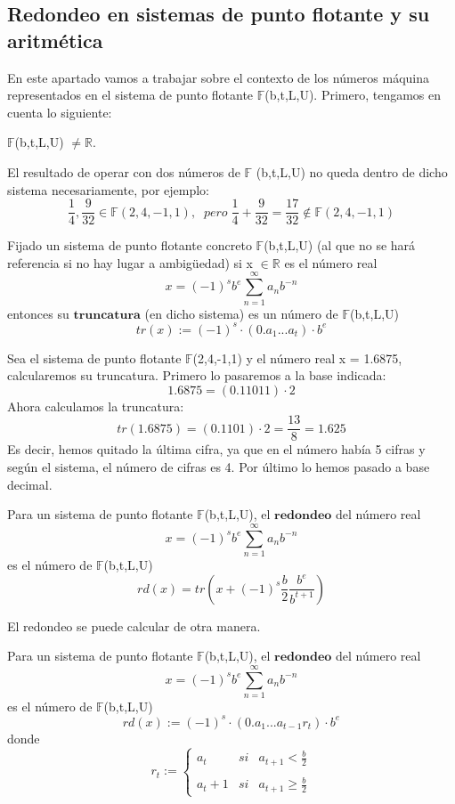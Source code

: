 \subsection{Redondeo en sistemas de punto flotante y su aritmética}
En este apartado vamos a trabajar sobre el contexto de los números máquina representados en el sistema de punto flotante $\mathbb{F}$(b,t,L,U). Primero, tengamos en cuenta lo siguiente:
	\begin{nlist}
	\item $\mathbb{F}$(b,t,L,U) $\neq \mathbb{R}$.
	\item El resultado de operar con dos números de $\mathbb{F}$ (b,t,L,U) no queda dentro de dicho sistema necesariamente, por ejemplo:
	\[ \frac{1}{4}, \frac{9}{32} \in \mathbb{F} (2,4,-1,1), \; \; pero \; \frac{1}{4} + \frac{9}{32} = \frac{17}{32} \notin \mathbb{F} (2,4,-1,1) \]
	\end{nlist}

\begin{ndef}[Truncatura]
Fijado un sistema de punto flotante concreto $\mathbb{F}$(b,t,L,U) (al que no se hará referencia si no hay lugar a ambigüedad) si x $\in \mathbb{R}$ es el número real
\[ x =(-1)^sb^e \sum_{n=1}^{\infty} a_nb^{-n} \]
entonces su $\textbf{truncatura}$ (en dicho sistema) es un número de $\mathbb{F}$(b,t,L,U)
\[ tr(x) := (-1)^s \cdot (0.a_1...a_t) \cdot b^e \]
\end{ndef}

\begin{ejemplo}
Sea el sistema de punto flotante $\mathbb{F}$(2,4,-1,1) y el número real x = 1.6875, calcularemos su truncatura. Primero lo pasaremos a la base indicada:
\[ 1.6875 = (0.11011) \cdot 2 \]
Ahora calculamos la truncatura:
\[ tr(1.6875) = (0.1101) \cdot 2 = \frac{13}{8} = 1.625 \]
Es decir, hemos quitado la última cifra, ya que en el número había 5 cifras y según el sistema, el número de cifras es 4. Por último lo hemos pasado a base decimal.
\end{ejemplo}

\begin{ndef}
Para un sistema de punto flotante  $\mathbb{F}$(b,t,L,U), el $\textbf{redondeo}$ del número real
\[ x = (-1)^sb^e \sum_{n=1}^{\infty} a_nb^{-n} \]
es el número de $\mathbb{F}$(b,t,L,U)
\[ rd(x) = tr \left( x + (-1)^s \frac{b}{2} \frac{b^e}{b^{t+1}} \right) \]
\end{ndef}

El redondeo se puede calcular de otra manera.

\begin{nprop}
Para un sistema de punto flotante  $\mathbb{F}$(b,t,L,U), el $\textbf{redondeo}$ del número real
\[ x = (-1)^sb^e \sum_{n=1}^{\infty} a_nb^{-n} \]
es el número de $\mathbb{F}$(b,t,L,U)
\[ rd(x) := (-1)^s \cdot (0.a_1...a_{t-1}r_t) \cdot b^e \]
donde
\[ r_t := \left\{ \begin{array}{lcc}
a_t & si & a_{t+1} < \frac{b}{2}\\
\\ a_t +1 & si & a_{t+1} \geq \frac{b}{2}
\end{array}
\right. \]
\end{nprop}


